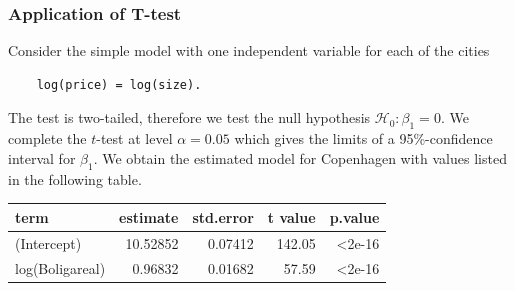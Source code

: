 \subsubsection{Application of T-test}  \label{ex:ttest}
Consider the simple model with one independent variable for each of the cities 
\begin{lstlisting} 
    log(price) = log(size). 
\end{lstlisting}
The test is two-tailed, therefore we test the null hypothesis $\mathcal{H}_0:\beta_1=0.$
We complete the $t$-test at level $\alpha=0.05$ which gives the limits of a 95\%-confidence interval for $\hat{\beta}_1$.
We obtain the estimated model for Copenhagen with values listed in the following table.

\begin{table}[H]
\centering
\begin{tabular}{lrrrr}
\toprule
\textbf{term} & \textbf{estimate} & \textbf{std.error} & \textbf{t value} & \textbf{p.value}\\
\midrule
(Intercept) & 10.52852 & 0.07412 & 142.05 & <2e-16\\
log(Boligareal) & 0.96832 & 0.01682 & 57.59 & <2e-16\\
\bottomrule
\end{tabular}
\end{table}

